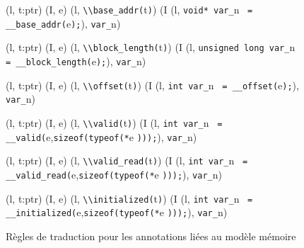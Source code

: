 \begin{figure*}[b!]
  \scriptsize{
    {
      {(l, t:ptr) \trule (I, e) }
      {(l, \mbox{\lstinline'\\base_addr('}t\mbox{\lstinline')'}) \trule
        (I \concat
        (l, \mbox{\lstinline'void* var_'}n~
        \mbox{\lstinline'= __base_addr('}e\mbox{\lstinline');'}),
        \mbox{\lstinline'var_'}n)
      }{}
    }

    {
      {(l, t:ptr) \trule (I, e) }
      {(l, \mbox{\lstinline'\\block_length('}t\mbox{\lstinline')'}) \trule
        (I \concat
        (l, \mbox{\lstinline'unsigned long var_'}n~
        \mbox{\lstinline'= __block_length('}e\mbox{\lstinline');'}),
        \mbox{\lstinline'var_'}n)
      }{}
    }

    {
      {(l, t:ptr) \trule (I, e) }
      {(l, \mbox{\lstinline'\\offset('}t\mbox{\lstinline')'}) \trule
        (I \concat
        (l, \mbox{\lstinline'int var_'}n~
        \mbox{\lstinline'= __offset('}e\mbox{\lstinline');'}),
        \mbox{\lstinline'var_'}n)
      }{}
    }

    {
      {(l, t:ptr) \trule (I, e) }
      {(l, \mbox{\lstinline'\\valid('}t\mbox{\lstinline')'}) \prule
        (I \concat
        (l, \mbox{\lstinline'int var_'}n~
        \mbox{\lstinline'= __valid('}e,\mbox{\lstinline'sizeof(typeof(*'}e
        \mbox{\lstinline')));'}),
        \mbox{\lstinline'var_'}n)
      }{}
    }

    {
      {(l, t:ptr) \trule (I, e) }
      {(l, \mbox{\lstinline'\\valid_read('}t\mbox{\lstinline')'}) \prule
        (I \concat
        (l, \mbox{\lstinline'int var_'}n~
        \mbox{\lstinline'= __valid_read('}e,\mbox{\lstinline'sizeof(typeof(*'}e
        \mbox{\lstinline')));'}),
        \mbox{\lstinline'var_'}n)
      }{}
    }

    {
      {(l, t:ptr) \trule (I, e) }
      {(l, \mbox{\lstinline'\\initialized('}t\mbox{\lstinline')'}) \prule
        (I \concat
        (l, \mbox{\lstinline'int var_'}n~
        \mbox{\lstinline'= __initialized('}e,\mbox{\lstinline'sizeof(typeof(*'}e
        \mbox{\lstinline')));'}),
        \mbox{\lstinline'var_'}n)
      }{}
    }
  }
  \caption{Règles de traduction pour les annotations liées au modèle mémoire}
  \label{fig:mem-annots-rules}
\end{figure*}


